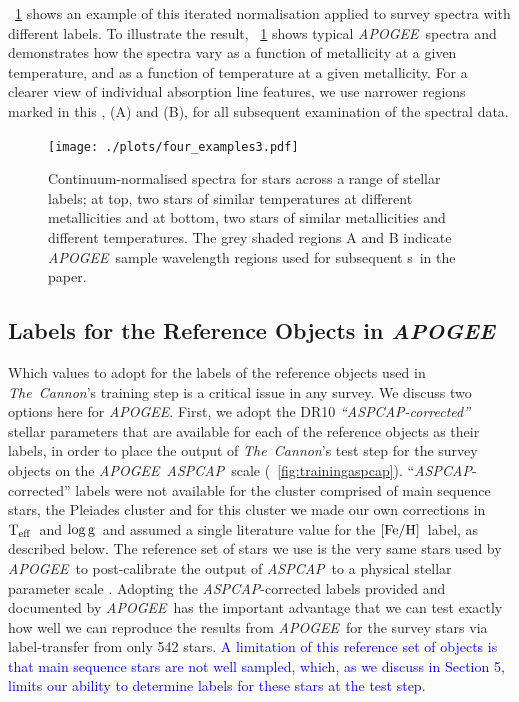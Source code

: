 \documentclass[12pt, preprint]{aastex}
\newcommand{\figurenames}{\figurename s}
\newcommand{\tc}{\textsl{The~Cannon}}
\newcommand{\apogee}{\textsl{APOGEE}}
\newcommand{\aspcap}{\textsl{ASPCAP}}
\newcommand{\teff}{\mbox{$\rm T_{eff}$}}
\newcommand{\feh}{\mbox{$\rm [Fe/H]$}}
\newcommand{\logg}{\mbox{$\rm \log g$}}
\begin{document}
\figurename~\ref{fig:norm} shows an example of this iterated normalisation applied to survey spectra with different labels. To illustrate the result, \figurename~\ref{fig:norm} shows typical \apogee\ spectra and demonstrates how the spectra 
vary as a function of metallicity at a given temperature, and as a function of temperature at a given metallicity. 
For a clearer view of individual absorption line features, we use narrower regions marked in this \figurename, (A) and (B), for all subsequent examination of the spectral data. 

\begin{figure}[h!]
  \texttt{[image: ./plots/four\_examples3.pdf]}
\caption{Continuum-normalised spectra for stars across a range of stellar labels; at top, two stars of similar temperatures at different metallicities and at bottom, two stars of similar metallicities and different temperatures. The grey shaded regions A and B indicate \apogee\ sample wavelength regions used for subsequent \figurenames\ in the paper.}
\label{fig:norm}
\end{figure}



\subsection{Labels for the Reference Objects in \apogee}
\label{sec:ApogeeRefLabels}

Which values to adopt for the labels of the reference objects used in \tc 's training step is a critical issue
in any survey. We discuss two options here for \apogee . 
First, we adopt the DR10 \textit{``\aspcap-corrected''} stellar parameters \citep{Meszaros2013} that are available for each of the reference objects as their labels, in order to place the output of \tc 's test step for the survey objects on the \apogee\ \aspcap\ scale (\figurename~\ref{fig:trainingaspcap}). ``\aspcap-corrected'' labels were not available for the cluster comprised of main sequence stars, the Pleiades cluster and for this cluster we made our own corrections in \teff\ and \logg\ and assumed a single literature value for the \feh\ label, as described below. 
The reference set of stars we use is the very same stars used by \apogee\ to post-calibrate the output of \aspcap\ to a physical stellar parameter scale \citep{Meszaros2013}.
Adopting the \aspcap-corrected labels provided and documented by \apogee\ has the important advantage 
that we can test exactly how well we can reproduce the results from \apogee\ for the survey stars via label-transfer from only 542 stars. \textcolor{blue}{A limitation of this reference set of objects is that main sequence stars are not well sampled, which, as we discuss in Section 5, limits our ability to determine labels for these stars at the test step. }
\end{document}
